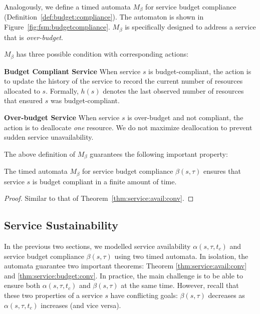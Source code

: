 Analogously, we define a timed automata $M_\beta$ for service budget compliance (Definition~\ref{def:budget:compliance}). The automaton is shown in Figure~\ref{fig:fsm:budgetcompliance}.  $M_\beta$ is specifically designed to address a service that is \emph{over-budget}.
% 

$M_\beta$ has three possible condition with corresponding actions:

\textbf{Budget Compliant Service}
  When service $s$ is budget-compliant, the action is to update the history of the service to record the current number of resources allocated to $s$. 
  Formally, $h(s)$ denotes the last observed number of resources that ensured $s$ was budget-compliant.

\textbf{Over-budget Service}
  When service $s$ is over-budget and not compliant, the action is to deallocate \emph{one} resource.
  We do not maximize deallocation to prevent sudden service unavailability.

The above definition of $M_\beta$ guarantees the following important property:

\begin{defn}
\label{thm:service:budget:conv}
The timed automata $M_\beta$ for service budget compliance $\beta(s,\tau)$ ensures that service $s$ is budget compliant in a finite amount of time.
\end{defn}

\begin{proof}%
Similar to that of Theorem~\ref{thm:service:avail:conv}.
\end{proof}

\subsection{Service Sustainability}
\label{sec:service:sustain}

In the previous two sections, we modelled service availability $\alpha(s,\tau,t_c)$ and service budget compliance $\beta(s,\tau)$ using two timed automata.
In isolation, the automata guarantee two important theorems: Theorem \ref{thm:service:avail:conv} and \ref{thm:service:budget:conv}.
In practice, the main challenge is to be able to ensure both $\alpha(s,\tau,t_c)$ and $\beta(s,\tau)$ at the same time.
However, recall that these two properties of a service $s$ have conflicting goals: $\beta(s,\tau)$ decreases as $\alpha(s,\tau,t_c)$ increases (and vice versa).
